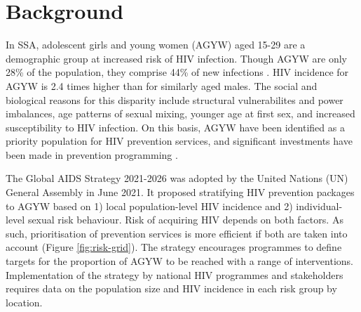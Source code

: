 \documentclass[a4paper, nobind]{templates/ociamthesis}
\begin{document}
\hypertarget{background-2}{%
\section{Background}\label{background-2}}

In SSA, adolescent girls and young women (AGYW) aged 15-29 are a demographic group at increased risk of HIV infection.
Though AGYW are only 28\% of the population, they comprise 44\% of new infections \autocite{unaids2021update}.
HIV incidence for AGYW is 2.4 times higher than for similarly aged males.
The social and biological reasons for this disparity include structural vulnerabilites and power imbalances, age patterns of sexual mixing, younger age at first sex, and increased susceptibility to HIV infection.
On this basis, AGYW have been identified as a priority population for HIV prevention services, and significant investments have been made in prevention programming \autocite{saul2018dreams,global2018measurement}.

The Global AIDS Strategy 2021-2026 \autocite{unaids2021global} was adopted by the United Nations (UN) General Assembly in June 2021.
It proposed stratifying HIV prevention packages to AGYW based on 1) local population-level HIV incidence and 2) individual-level sexual risk behaviour.
Risk of acquiring HIV depends on both factors.
As such, prioritisation of prevention services is more efficient if both are taken into account (Figure \ref{fig:risk-grid}).
The strategy encourages programmes to define targets for the proportion of AGYW to be reached with a range of interventions.
Implementation of the strategy by national HIV programmes and stakeholders requires data on the population size and HIV incidence in each risk group by location.
\end{document}
